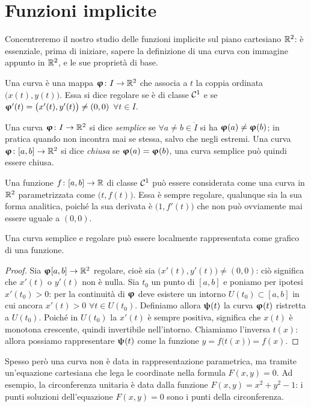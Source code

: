 \chapter{Funzioni implicite}
Concentreremo il nostro studio delle funzioni implicite sul piano cartesiano $\mathbb{R}^2$: è essenziale, prima di iniziare, sapere la definizione di una curva con immagine appunto in $\mathbb{R}^2$, e le sue proprietà di base.
\begin{definizione}
	Una curva è una mappa $\bm{\upvarphi}\colon I\to\mathbb{R}^2$ che associa a $t$ la coppia ordinata $\big(x(t),y(t)\big)$.
	Essa si dice regolare se è di classe $\mathcal{C}^{{1}}$ e se $\bm{\upvarphi}'(t)=\big(x'(t),y'(t)\big)\neq(0,0)$ $\forall t\in I$.
\end{definizione}
\begin{definizione}
	Una curva $\bm{\upvarphi}\colon I\to\mathbb{R}^2$ si dice \emph{semplice} se $\forall a\neq b\in \mathring{I}$ si ha $\bm{\upvarphi}(a)\neq\bm{\upvarphi}(b)$; in pratica quando non incontra mai se stessa, salvo che negli estremi.
	Una curva $\bm{\upvarphi}\colon [a,b]\to\mathbb{R}^2$ si dice \emph{chiusa} se $\bm{\upvarphi}(a)=\bm{\upvarphi}(b)$, una curva semplice può quindi essere chiusa.
\end{definizione}
Una funzione $f\colon[a,b]\to\mathbb{R}$ di classe $\mathcal{C}^{{1}}$ può essere considerata come una curva in $\mathbb{R}^2$ parametrizzata come $\big(t,f(t)\big)$.
Essa è sempre regolare, qualunque sia la sua forma analitica, poiché la sua derivata è $\big(1,f'(t)\big)$ che non può ovviamente mai essere uguale a $(0,0)$.
\begin{osservazione}
	Una curva semplice e regolare può essere localmente rappresentata come grafico di una funzione.
\end{osservazione}
\begin{proof}
	Sia $\bm{\upvarphi}[a,b]\to\mathbb{R}^2$ regolare, cioè sia $\big(x'(t),y'(t)\big)\neq(0,0)$: ciò significa che $x'(t)$ o $y'(t)$ non è nulla.
	Sia $t_0$ un punto di $[a,b]$ e poniamo per ipotesi $x'(t_0)>0$: per la continuità di $\bm{\upvarphi}$ deve esistere un intorno $U(t_0)\subset[a,b]$ in cui ancora $x'(t)>0$ $\forall t\in U(t_0)$.
	Definiamo allora $\bm{\uppsi}(t)$ la curva $\bm{\upvarphi}(t)$ ristretta a $U(t_0)$.
	Poiché in $U(t_0)$ la $x'(t)$ è sempre positiva, significa che $x(t)$ è monotona crescente, quindi invertibile nell'intorno.
	Chiamiamo l'inversa $t(x)$: allora possiamo rappresentare $\bm{\uppsi}(t)$ come la funzione $y=f\big(t(x)\big)=f(x)$.
\end{proof}
Spesso però una curva non è data in rappresentazione parametrica, ma tramite un'equazione cartesiana che lega le coordinate nella formula $F(x,y)=0$.
Ad esempio, la circonferenza unitaria è data dalla funzione $F(x,y)=x^2+y^2-1$: i punti soluzioni dell'equazione $F(x,y)=0$ sono i punti della circonferenza.
